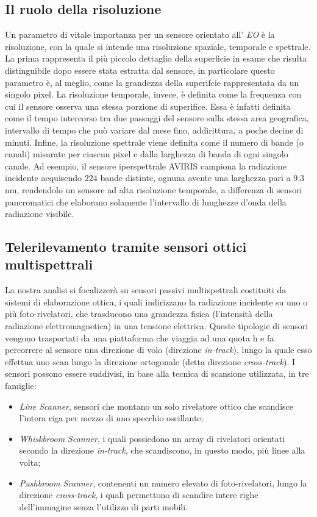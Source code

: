 \subsection{Il ruolo della risoluzione}
Un parametro di vitale importanza per un sensore orientato all' \emph{EO} è la risoluzione, con la quale si intende una risoluzione spaziale, temporale e spettrale.
La prima rappresenta il più piccolo dettaglio della superficie in esame che risulta distinguibile dopo essere stata estratta dal sensore, in particolare questo parametro è, al meglio, come la grandezza della superifcie rappresentata da un singolo pixel.
La risoluzione temporale, invece, è definita come la frequenza con cui il sensore osserva una stessa porzione di superifice. 
Essa è infatti definita come il tempo intercorso tra due passaggi del sensore sulla stessa area geografica, intervallo di tempo che può variare dal mese fino, addirittura, a poche decine di minuti.
Infine, la risoluzione spettrale viene definita come il numero di bande (o canali) misurate per ciascun pixel e dalla larghezza di banda di ogni singolo canale. Ad esempio, il sensore iperspettrale AVIRIS campiona la radiazione incidente acquisendo $224$ bande distinte, ognuna avente una larghezza pari a $9.3$ nm, rendendolo un sensore ad alta risoluzione temporale, a differenza di sensori pancromatici che elaborano solamente l'intervallo di lunghezze d'onda della radiazione visibile.


\subsection{Telerilevamento tramite sensori ottici multispettrali}
La nostra analisi si focalizzerà su sensori passivi multispettrali costituiti da sistemi di elaborazione ottica, i quali indirizzano la radiazione incidente su uno o più foto-rivelatori, che trasducono una grandezza fisica (l'intensità della radiazione elettromagnetica) in una tensione elettrica. Queste tipologie di sensori vengono trasportati da una piattaforma che viaggia ad una quota h e fa percorrere al sensore una direzione di volo (direzione \emph{in-track}), lungo la quale esso effettua uno scan lungo la direzione ortogonale (detta direzione \emph{cross-track}).
I sensori possono essere suddivisi, in base alla tecnica di scansione utilizzata, in tre famiglie:

\begin{itemize}
\item \emph{Line Scanner}, sensori che montano un solo rivelatore ottico che scandisce l'intera riga per mezzo di uno specchio oscillante;
\item \emph{Whiskbroom Scanner}, i quali possiedono un array di rivelatori orientati secondo la direzione \emph{in-track}, che scandiscono, in questo modo, più linee alla volta; 
\item \emph{Pushbroom Scanner}, contenenti un numero elevato di foto-rivelatori, lungo la direzione \emph{cross-track}, i quali permettono di scandire intere righe dell'immagine senza l'utilizzo di parti mobili.
\end{itemize}

